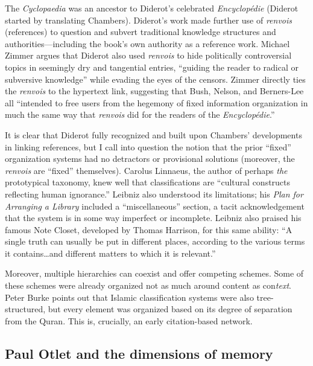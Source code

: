 The \emph{Cyclopaedia} was an ancestor to Diderot's celebrated \emph{Encyclop\'{e}die} (Diderot started by translating Chambers). Diderot's work made further use of \emph{renvois} (references) to question and subvert traditional knowledge structures and authorities---including the book's own authority as a reference work. Michael Zimmer argues that Diderot also used \emph{renvois} to hide politically controversial topics in seemingly dry and tangential entries, ``guiding the reader to radical or subversive knowledge'' while evading the eyes of the censors.\autocite[103]{zimmer_renvois_2009} Zimmer directly ties the \emph{renvois} to the hypertext link, suggesting that Bush, Nelson, and Berners-Lee all ``intended to free users from the hegemony of fixed information organization in much the same way that \emph{renvois} did for the readers of the \emph{Encyclop\'{e}die}.''\autocite[104]{zimmer_renvois_2009}

It is clear that Diderot fully recognized and built upon Chambers' developments in linking references, but I call into question the notion that the prior ``fixed'' organization systems had no detractors or provisional solutions (moreover, the \emph{renvois} are ``fixed'' themselves). Carolus Linnaeus, the author of perhaps \emph{the} prototypical taxonomy, knew well that classifications are ``cultural constructs reflecting human ignorance.''\autocite[99]{zimmer_renvois_2009} Leibniz also understood its limitations; his \emph{Plan for Arranging a Library} included a ``miscellaneous'' section, a tacit acknowledgement that the system is in some way imperfect or incomplete.\autocite{lost this cite, who is it? burke?} Leibniz also praised his famous Note Closet, developed by Thomas Harrison, for this same ability: ``A single truth can usually be put in different places, according to the various terms it contains\ldots and different matters to which it is relevant.''\autocite[``Managing Abundant Notes'']{blair_too_2010} 

Moreover, multiple hierarchies can coexist and offer competing schemes. Some of these schemes were already organized not as much around content as con\emph{text}. Peter Burke points out that Islamic classification systems were also tree-structured, but every element was organized based on its degree of separation from the Quran.\autocite[94]{burke_social_2000} This is, crucially, an early citation-based network.

\subsection{Paul Otlet and the dimensions of memory}

